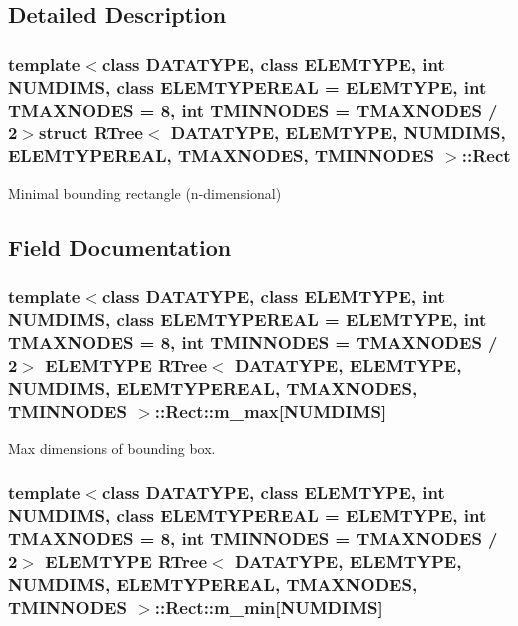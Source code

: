 \subsection{Detailed Description}
\subsubsection*{template$<$class D\-A\-T\-A\-T\-Y\-P\-E, class E\-L\-E\-M\-T\-Y\-P\-E, int N\-U\-M\-D\-I\-M\-S, class E\-L\-E\-M\-T\-Y\-P\-E\-R\-E\-A\-L = E\-L\-E\-M\-T\-Y\-P\-E, int T\-M\-A\-X\-N\-O\-D\-E\-S = 8, int T\-M\-I\-N\-N\-O\-D\-E\-S = T\-M\-A\-X\-N\-O\-D\-E\-S / 2$>$struct R\-Tree$<$ D\-A\-T\-A\-T\-Y\-P\-E, E\-L\-E\-M\-T\-Y\-P\-E, N\-U\-M\-D\-I\-M\-S, E\-L\-E\-M\-T\-Y\-P\-E\-R\-E\-A\-L, T\-M\-A\-X\-N\-O\-D\-E\-S, T\-M\-I\-N\-N\-O\-D\-E\-S $>$\-::\-Rect}

Minimal bounding rectangle (n-\/dimensional) 

\subsection{Field Documentation}
\hypertarget{structRTree_1_1Rect_a6570c2a5a16b19b0d08cd1eaa224961b}{
\subsubsection[{m\-\_\-max}]{\setlength{\rightskip}{0pt plus 5cm}template$<$class D\-A\-T\-A\-T\-Y\-P\-E, class E\-L\-E\-M\-T\-Y\-P\-E, int N\-U\-M\-D\-I\-M\-S, class E\-L\-E\-M\-T\-Y\-P\-E\-R\-E\-A\-L = E\-L\-E\-M\-T\-Y\-P\-E, int T\-M\-A\-X\-N\-O\-D\-E\-S = 8, int T\-M\-I\-N\-N\-O\-D\-E\-S = T\-M\-A\-X\-N\-O\-D\-E\-S / 2$>$ E\-L\-E\-M\-T\-Y\-P\-E {\bf R\-Tree}$<$ D\-A\-T\-A\-T\-Y\-P\-E, E\-L\-E\-M\-T\-Y\-P\-E, N\-U\-M\-D\-I\-M\-S, E\-L\-E\-M\-T\-Y\-P\-E\-R\-E\-A\-L, T\-M\-A\-X\-N\-O\-D\-E\-S, T\-M\-I\-N\-N\-O\-D\-E\-S $>$\-::Rect\-::m\-\_\-max\mbox{[}N\-U\-M\-D\-I\-M\-S\mbox{]}}}\label{structRTree_1_1Rect_a6570c2a5a16b19b0d08cd1eaa224961b}


Max dimensions of bounding box. 

\hypertarget{structRTree_1_1Rect_a2b5b254493aba27b30fe6fc8df151ed5}{
\subsubsection[{m\-\_\-min}]{\setlength{\rightskip}{0pt plus 5cm}template$<$class D\-A\-T\-A\-T\-Y\-P\-E, class E\-L\-E\-M\-T\-Y\-P\-E, int N\-U\-M\-D\-I\-M\-S, class E\-L\-E\-M\-T\-Y\-P\-E\-R\-E\-A\-L = E\-L\-E\-M\-T\-Y\-P\-E, int T\-M\-A\-X\-N\-O\-D\-E\-S = 8, int T\-M\-I\-N\-N\-O\-D\-E\-S = T\-M\-A\-X\-N\-O\-D\-E\-S / 2$>$ E\-L\-E\-M\-T\-Y\-P\-E {\bf R\-Tree}$<$ D\-A\-T\-A\-T\-Y\-P\-E, E\-L\-E\-M\-T\-Y\-P\-E, N\-U\-M\-D\-I\-M\-S, E\-L\-E\-M\-T\-Y\-P\-E\-R\-E\-A\-L, T\-M\-A\-X\-N\-O\-D\-E\-S, T\-M\-I\-N\-N\-O\-D\-E\-S $>$\-::Rect\-::m\-\_\-min\mbox{[}N\-U\-M\-D\-I\-M\-S\mbox{]}}}\label{structRTree_1_1Rect_a2b5b254493aba27b30fe6fc8df151ed5}


